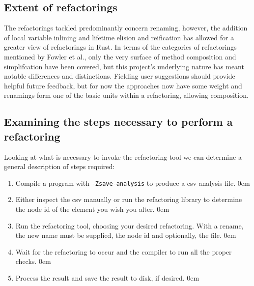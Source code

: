 
\subsection{Extent of refactorings}\label{S:extentn}

The refactorings tackled predominantly concern renaming, however, the addition of local variable inlining and lifetime elision and reification has allowed for a greater view of refactorings in Rust. In terms of the categories of refactorings mentioned by Fowler et al., only the very surface of method composition and simplifcation have been covered, but this project's underlying nature has meant notable differences and distinctions. Fielding user suggestions should provide helpful future feedback, but for now the approaches now have some weight and renamings form one of the basic units within a refactoring, allowing composition.




\subsection{Examining the steps necessary to perform a refactoring}\label{S:stepsn}

Looking at what is necessary to invoke the refactoring tool we can determine a general description of steps required:

\begin{enumerate}
\item Compile a program with {\verb|-Zsave-analysis|} to produce a csv analysis file.
\itemsep0em 
\item Either inspect the csv manually or run the refactoring library to determine the node id of the element you wish you alter.
\itemsep0em 
\item Run the refactoring tool, choosing your desired refactoring. With a rename, the new name must be supplied, the node id and optionally, the file.
\itemsep0em 
\item Wait for the refactoring to occur and the compiler to run all the proper checks. 
\itemsep0em 
\item Process the result and save the result to disk, if desired.
\itemsep0em 
\end{enumerate}

